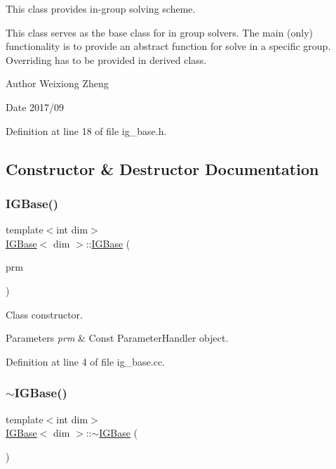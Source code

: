 This class provides in-\/group solving scheme. 

This class serves as the base class for in group solvers. The main (only) functionality is to provide an abstract function for solve in a specific group. Overriding has to be provided in derived class.

\begin{DoxyAuthor}{Author}
Weixiong Zheng 
\end{DoxyAuthor}
\begin{DoxyDate}{Date}
2017/09 
\end{DoxyDate}


Definition at line 18 of file ig\+\_\+base.\+h.



\subsection{Constructor \& Destructor Documentation}
\mbox{\label{class_i_g_base_a50fb50b4a31894ddf7957f5bed6d74e7}} 
\subsubsection{\texorpdfstring{I\+G\+Base()}{IGBase()}}
{\footnotesize\ttfamily template$<$int dim$>$ \\
\hyperlink{class_i_g_base}{I\+G\+Base}$<$ dim $>$\+::\hyperlink{class_i_g_base}{I\+G\+Base} (\begin{DoxyParamCaption}\item[{const Parameter\+Handler \&}]{prm }\end{DoxyParamCaption})}

Class constructor.


\begin{DoxyParams}{Parameters}
{\em prm} & Const Parameter\+Handler object. \\
\hline
\end{DoxyParams}


Definition at line 4 of file ig\+\_\+base.\+cc.

\mbox{\label{class_i_g_base_abde968ae9031dd55de0193896a0134b9}} 
\subsubsection{\texorpdfstring{$\sim$\+I\+G\+Base()}{~IGBase()}}
{\footnotesize\ttfamily template$<$int dim$>$ \\
\hyperlink{class_i_g_base}{I\+G\+Base}$<$ dim $>$\+::$\sim$\hyperlink{class_i_g_base}{I\+G\+Base} (\begin{DoxyParamCaption}{ }\end{DoxyParamCaption})\hspace{0.3cm}{\ttfamily [virtual]}}



